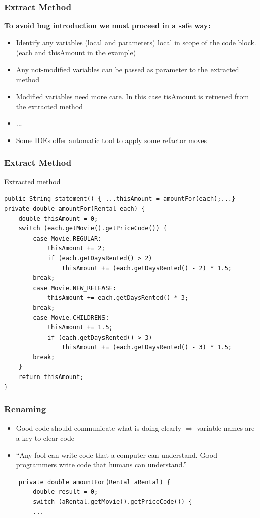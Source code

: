 \documentclass{beamer}
\begin{document}
\begin{frame}
  \frametitle{Extract Method}
  \textbf{To avoid bug introduction we must proceed in a safe way:}
   \begin{itemize}
  		\item Identify any variables (local and parameters) local in scope of the code block. (each and thisAmount in the example)
		\item Any not-modified variables can be passed as parameter to the extracted method
		\item Modified variables need more care. In this case tisAmount is retuened from the extracted method
		\item ...		
		\item Some IDEs offer automatic tool to apply some refactor moves
  \end{itemize}
\end{frame}

\begin{frame}[containsverbatim]
	\frametitle{Extract Method}
	Extracted method \\
	\begin{lstlisting}
public String statement() { ...thisAmount = amountFor(each);...}
private double amountFor(Rental each) {
	double thisAmount = 0;
	switch (each.getMovie().getPriceCode()) {
		case Movie.REGULAR:
			thisAmount += 2;
			if (each.getDaysRented() > 2)
				thisAmount += (each.getDaysRented() - 2) * 1.5;
		break;
		case Movie.NEW_RELEASE:
			thisAmount += each.getDaysRented() * 3;
		break;
		case Movie.CHILDRENS:
			thisAmount += 1.5;
			if (each.getDaysRented() > 3)
				thisAmount += (each.getDaysRented() - 3) * 1.5;
		break;
	}
	return thisAmount;
}
\end{lstlisting}
\end{frame}

\begin{frame}[containsverbatim]
  \frametitle{Renaming}
   \begin{itemize}
     \item Good code should communicate what is doing clearly $\Rightarrow$ variable names are a key to clear code
   \item  ``Any fool can write code that a computer can understand. Good programmers write
code that humans can understand.''
	\end{itemize}
	\begin{lstlisting}
	private double amountFor(Rental aRental) {
		double result = 0;
		switch (aRental.getMovie().getPriceCode()) {
		...
	\end{lstlisting}
\end{frame}
\end{document}
